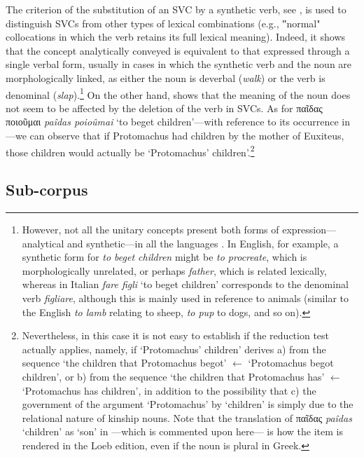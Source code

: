 \documentclass[output=paper,colorlinks,citecolor=brown]{langscibook}
\begin{document}
The criterion of the substitution of an SVC by a synthetic verb, see , is used to distinguish SVCs from other types of lexical combinations (e.g., ‟normal" collocations in which the verb retains its full lexical meaning). Indeed, it shows that the concept analytically conveyed is equivalent to that expressed through a single verbal form, usually in cases in which the synthetic verb and the noun are morphologically linked, as either the noun is deverbal (\textit{walk}) or the verb is denominal (\textit{slap}).\footnote{However, not all the unitary concepts present both forms of expression---analytical and synthetic---in all the languages \citep[192]{Jezek2004}. In English, for example, a synthetic form for \textit{to beget children} might be \textit{to procreate}, which is morphologically unrelated, or perhaps \textit{father}, which is related lexically, whereas in Italian \textit{fare figli} `to beget children' corresponds to the denominal verb \textit{figliare}, although this is mainly used in reference to animals (similar to the English \textit{to lamb} relating to sheep, \textit{to pup} to dogs, and so on).} On the other hand,  shows that the meaning of the noun does not seem to be affected by the deletion of the verb in SVCs. As for παῖδας ποιοῦμαι \textit{paîdas poioûmai} `to beget children'---with reference to its occurrence in ---we can observe that if Protomachus had children by the mother of Euxiteus, those children would actually be `Protomachus' children'.\footnote{Nevertheless, in this case it is not easy to establish if the reduction test actually applies, namely, if `Protomachus' children' derives a) from the sequence `the children that Protomachus begot' $\leftarrow$ `Protomachus begot children', or b) from the sequence `the children that Protomachus has' $\leftarrow$ `Protomachus has children', in addition to the possibility that c) the government of the argument `Protomachus' by `children' is simply due to the relational nature of kinship nouns. Note that the translation of παῖδας \textit{paîdas} `children' as `son' in ---which is commented upon here--- is how the item is rendered in the Loeb edition, even if the noun is plural in Greek.}

\subsection{Sub-corpus}\label{Section2/1}
\end{document}
